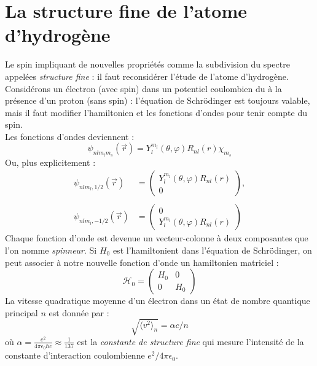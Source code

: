 \documentclass	[11pt, a4paper, openany]{book}
\begin{document}
	\section{La structure fine de l'atome d'hydrogène}
	Le spin impliquant de nouvelles propriétés comme la subdivision du spectre appelées 
	\textit{structure fine} : il faut reconsidérer l'étude de l'atome d'hydrogène.\\
	Considérons un électron (avec spin) dans un potentiel coulombien du à la présence 
	d'un proton (sans spin) : l'équation de Schrödinger est toujours valable, mais il 
	faut modifier l'hamiltonien et les fonctions d'ondes pour tenir compte du spin.\\
	Les fonctions d'ondes deviennent : 
	\begin{equation}
	\psi_{nlm_lm_s}(\vec{r}) = Y_l^{m_l}(\theta,\varphi)R_{nl}(r)\chi_{m_s}
	\end{equation}
	Ou, plus explicitement :
	\begin{equation}
	\begin{array}{ll}
	\psi_{nlm_l,1/2}(\vec{r}) &= \left(\begin{array}{cc}
	Y_l^{m_l}(\theta,\varphi)R_{nl}(r)\\
	0
	\end{array}\right),\\
	 & \\
	\psi_{nlm_l,-1/2}(\vec{r}) &= \left(\begin{array}{cc}
	0\\
	Y_l^{m_l}(\theta,\varphi)R_{nl}(r)
	\end{array}\right)
	\end{array}
	\end{equation}
	Chaque fonction d'onde est devenue un vecteur-colonne à deux composantes que l'on 
	nomme \textit{spinneur}. Si $H_0$ est l'hamiltonient dans l'équation de Schrödinger,
	on peut associer à notre nouvelle fonction d'onde un hamiltonien matriciel :
	\begin{equation}
	\mathcal{H}_0 =\left(\begin{array}{cc}
	H_0 & 0\\
	0 & H_0
	\end{array}\right)
	\end{equation}
	La vitesse quadratique moyenne d'un électron dans un état de nombre quantique 
	principal $n$ est donnée par :
	\begin{equation}
	\sqrt{\langle v^2\rangle_n} = \alpha c/n
	\end{equation}
	où $\alpha = \frac{e^2}{4\pi\epsilon_0\hbar c}	 \approx \frac{1}{137}$ est la \textit{
	constante de structure fine} qui mesure l'intensité de la constante d'interaction 
	coulombienne $e^2/4\pi\epsilon_0$.\\
	
\end{document}

